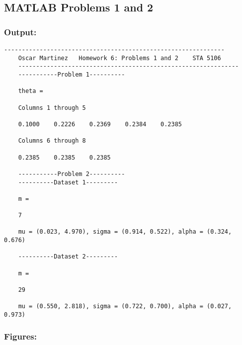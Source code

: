 \documentclass[12pt]{article}
\begin{document}
	 
	\subsection*{MATLAB Problems 1 and 2}
	\subsubsection*{Output:}
	\begin{Verbatim}[fontsize=\small]
	--------------------------------------------------------------
	Oscar Martinez 	 Homework 6: Problems 1 and 2 	 STA 5106
	--------------------------------------------------------------
	-----------Problem 1----------
	
	theta =
	
	Columns 1 through 5
	
	0.1000    0.2226    0.2369    0.2384    0.2385
	
	Columns 6 through 8
	
	0.2385    0.2385    0.2385
	
	-----------Problem 2----------
	----------Dataset 1---------
	
	m =
	
	7
	
	mu = (0.023, 4.970), sigma = (0.914, 0.522), alpha = (0.324, 0.676) 
	
	----------Dataset 2---------
	
	m =
	
	29
	
	mu = (0.550, 2.818), sigma = (0.722, 0.700), alpha = (0.027, 0.973) 
	\end{Verbatim}
	
	\subsubsection*{Figures:}
	\begin{center}
	\end{center}
		\begin{center}
	\end{center}
	
\end{document}
